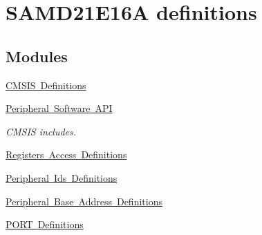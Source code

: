 \hypertarget{group___s_a_m_d21_e16_a__definitions}{}\section{S\+A\+M\+D21\+E16A definitions}
\label{group___s_a_m_d21_e16_a__definitions}
\subsection*{Modules}
\begin{DoxyCompactItemize}
\item 
\mbox{\hyperlink{group___s_a_m_d21_e16_a__cmsis}{C\+M\+S\+I\+S Definitions}}
\item 
\mbox{\hyperlink{group___s_a_m_d21_e16_a__api}{Peripheral Software A\+PI}}
\begin{DoxyCompactList}\small\item\em C\+M\+S\+IS includes. \end{DoxyCompactList}\item 
\mbox{\hyperlink{group___s_a_m_d21_e16_a__reg}{Registers Access Definitions}}
\item 
\mbox{\hyperlink{group___s_a_m_d21_e16_a__id}{Peripheral Ids Definitions}}
\item 
\mbox{\hyperlink{group___s_a_m_d21_e16_a__base}{Peripheral Base Address Definitions}}
\item 
\mbox{\hyperlink{group___s_a_m_d21_e16_a__port}{P\+O\+R\+T Definitions}}
\end{DoxyCompactItemize}

